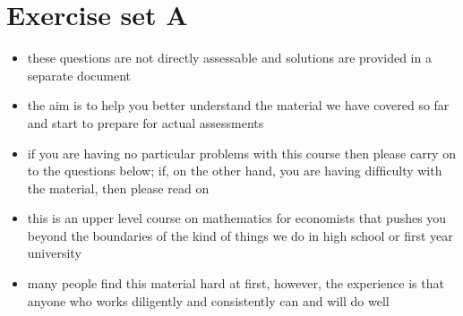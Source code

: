 \documentclass[letterpaper,10pt,english]{jupyterBook}
\begin{document}
\chapter{Exercise set A}
\label{\detokenize{02.exercises.A:exercise-set-a}}\label{\detokenize{02.exercises.A::doc}}
\sphinxAtStartPar
{}
\begin{itemize}
\item {} 
\sphinxAtStartPar
these questions are not directly assessable and solutions are provided in a separate document

\item {} 
\sphinxAtStartPar
the aim is to help you better understand the material we have covered so far and start to prepare for actual assessments

\item {} 
\sphinxAtStartPar
if you are having no particular problems with this course then
please carry on to the questions below; if, on the other hand, you are having difﬁculty with the material, then please read on

\item {} 
\sphinxAtStartPar
this is an upper level course on mathematics for economists that pushes you beyond the boundaries of the kind of things we do in high school or ﬁrst year university

\item {} 
\sphinxAtStartPar
many people ﬁnd this material hard at ﬁrst, however, the experience is that anyone who works diligently and consistently can and will do well

\end{itemize}
\end{document}
